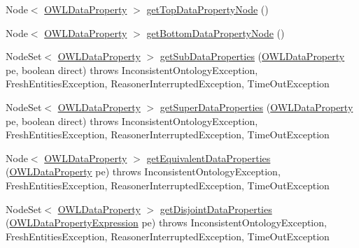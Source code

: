 \begin{DoxyCompactItemize}
\item 
Node$<$ \hyperlink{interfaceorg_1_1semanticweb_1_1owlapi_1_1model_1_1_o_w_l_data_property}{O\-W\-L\-Data\-Property} $>$ \hyperlink{interfaceorg_1_1semanticweb_1_1owlapi_1_1reasoner_1_1_o_w_l_reasoner_ad3497cb620e2cc218bd4a05bbda5d1dc}{get\-Top\-Data\-Property\-Node} ()
\item 
Node$<$ \hyperlink{interfaceorg_1_1semanticweb_1_1owlapi_1_1model_1_1_o_w_l_data_property}{O\-W\-L\-Data\-Property} $>$ \hyperlink{interfaceorg_1_1semanticweb_1_1owlapi_1_1reasoner_1_1_o_w_l_reasoner_a4116df42380c2afeae56455e211f7e6b}{get\-Bottom\-Data\-Property\-Node} ()
\item 
Node\-Set$<$ \hyperlink{interfaceorg_1_1semanticweb_1_1owlapi_1_1model_1_1_o_w_l_data_property}{O\-W\-L\-Data\-Property} $>$ \hyperlink{interfaceorg_1_1semanticweb_1_1owlapi_1_1reasoner_1_1_o_w_l_reasoner_a2e3c782999b0ab23f85b80605a8dc3ca}{get\-Sub\-Data\-Properties} (\hyperlink{interfaceorg_1_1semanticweb_1_1owlapi_1_1model_1_1_o_w_l_data_property}{O\-W\-L\-Data\-Property} pe, boolean direct)  throws Inconsistent\-Ontology\-Exception, Fresh\-Entities\-Exception, Reasoner\-Interrupted\-Exception, Time\-Out\-Exception
\item 
Node\-Set$<$ \hyperlink{interfaceorg_1_1semanticweb_1_1owlapi_1_1model_1_1_o_w_l_data_property}{O\-W\-L\-Data\-Property} $>$ \hyperlink{interfaceorg_1_1semanticweb_1_1owlapi_1_1reasoner_1_1_o_w_l_reasoner_a9c2703f5b0202c909e29ddd2169a282e}{get\-Super\-Data\-Properties} (\hyperlink{interfaceorg_1_1semanticweb_1_1owlapi_1_1model_1_1_o_w_l_data_property}{O\-W\-L\-Data\-Property} pe, boolean direct)  throws Inconsistent\-Ontology\-Exception, Fresh\-Entities\-Exception, Reasoner\-Interrupted\-Exception, Time\-Out\-Exception
\item 
Node$<$ \hyperlink{interfaceorg_1_1semanticweb_1_1owlapi_1_1model_1_1_o_w_l_data_property}{O\-W\-L\-Data\-Property} $>$ \hyperlink{interfaceorg_1_1semanticweb_1_1owlapi_1_1reasoner_1_1_o_w_l_reasoner_a601c0ca24b4aeb85aadc29e57341779e}{get\-Equivalent\-Data\-Properties} (\hyperlink{interfaceorg_1_1semanticweb_1_1owlapi_1_1model_1_1_o_w_l_data_property}{O\-W\-L\-Data\-Property} pe)  throws Inconsistent\-Ontology\-Exception, Fresh\-Entities\-Exception, Reasoner\-Interrupted\-Exception, Time\-Out\-Exception
\item 
Node\-Set$<$ \hyperlink{interfaceorg_1_1semanticweb_1_1owlapi_1_1model_1_1_o_w_l_data_property}{O\-W\-L\-Data\-Property} $>$ \hyperlink{interfaceorg_1_1semanticweb_1_1owlapi_1_1reasoner_1_1_o_w_l_reasoner_a827a1e3436adcb93bb66b639012e3bb5}{get\-Disjoint\-Data\-Properties} (\hyperlink{interfaceorg_1_1semanticweb_1_1owlapi_1_1model_1_1_o_w_l_data_property_expression}{O\-W\-L\-Data\-Property\-Expression} pe)  throws Inconsistent\-Ontology\-Exception, Fresh\-Entities\-Exception, Reasoner\-Interrupted\-Exception, Time\-Out\-Exception

\end{DoxyCompactItemize}
